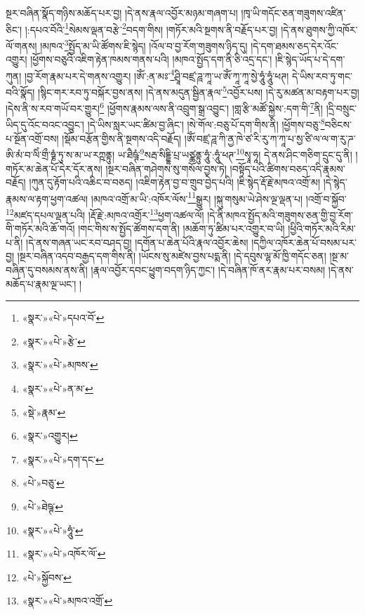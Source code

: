 སྔར་བཞིན་སྣོད་གཉིས་མཆོད་པར་བྱ། །དེ་ནས་རྣལ་འབྱོར་མཉམ་གཞག་པ། །ཁྭ་ཡི་གདོང་ཅན་གཟུགས་འཛིན་ཅིང་། །:དཔའ་བོའི་\footnote{«སྣར་»«པེ་»དཔའ་བོ་}སེམས་ལྡན་བརྩེ་\footnote{«སྣར་»«པེ་»རྩེ་}བདག་གིས། །གཏོར་མའི་སྔགས་ནི་བརྗོད་པར་བྱ། །དེ་ནས་ཐུགས་ཀྱི་འཁོར་ལོ་གནས། །མཁའ་\footnote{«སྣར་»«པེ་»མཁས་}སྤྱོད་མ་ཡི་ཚོགས་ཇི་སྙེད། །འོལ་བ་བྱ་རོག་གཟུགས་ཉིད་དུ། །དེ་དག་ཐམས་ཅད་དེར་འོང་འགྱུར། །ཕྱོགས་བཅུའི་འཇིག་རྟེན་ཁམས་གནས་པའི། །མཁའ་སྤྱོད་དག་ནི་ཅི་འདྲ་དང་། །ཇི་སྙེད་ཡོད་པ་དེ་དག་ཀུན། །བྱ་རོག་རྣམ་པར་དེ་གནས་འགྱུར། །ཨོཾ་:ན་མཿ་\footnote{«སྣར་»«པེ་»ན་མ་}ཤྲཱི་བཛྲ་ཌཱ་ཀཱ་ཡ་ཨོཾ་ཀཱ་ཀཱ་སྱེ་ཧཱུཾ་ཧཱུཾ་ཕཊ། དེ་ཡིས་རབ་ཏུ་གང་བའི་སྣོད། །སྙིང་གར་རབ་ཏུ་བསྐོར་བྱས་ནས། །དེ་ནས་མདུན་སྦྱིན་རྣལ་\footnote{«སྡེ་»རྣམ་}འབྱོར་པས། །དེ་རུ་མཚན་མ་བརྟག་པར་བྱ། །དེས་ནི་ས་རབ་གཡོ་བར་གྱུར།\footnote{«སྣར་»འགྱུར།} །ཕྱོགས་རྣམས་ལས་ནི་འབྲུག་སྒྲ་འབྱུང་། །གླ་རྩི་མཚོ་སྐྱེས་:དག་གི་\footnote{«སྣར་»«པེ་»དག་དང་}ནི། །དྲི་བསྲུང་ཡིད་དུ་འོང་བའང་འབྱུང་། །དེ་ཡིས་སླར་ཡང་ཚིམ་བྱ་ཞིང་། །སེ་གོལ་:བཅུ་པོ་དག་གིས་ནི། །ཕྱོགས་བཅུ་\footnote{«པེ་»བཅུ་}བཅིངས་པ་སྔོན་འགྲོ་བས། །སྡོམ་བརྩོན་གྱིས་ནི་སྔགས་འདི་བརྗོད། །ཨོཾ་བཛྲ་ཌཱ་ཀི་ནྱ་ཁེ་ཙ་རི་རུ་ཀ་ཀཱ་པ་སྱ་ཙི་ལ་ལ་ག་རུ་ཌ་ཨི་མཾ་བ་ལིཾ་གྲྀ་ཧྞཾ་ཏུ་ས་མ་ཡ་རཀྵནྟུ། ཡ་ཐཻཥྚཾ་\footnote{«པེ་»ཐེཥྚ་}སརྦ་སིདྡྷི་པྲ་ཡཙྪནྟུ་ཧཱུཾ་:ཧཱུཾ་ཕཊ་\footnote{«སྣར་»«པེ་»ཧཱུཾ་}སྭཱ་ཧཱ། དེ་ནས་ཤིང་གཅིག་དྲུང་དུ་ནི། །གཏོར་མ་ཆེན་པོ་དེར་དོར་ནས། །སྔར་བཞིན་གཤེགས་སུ་གསོལ་བྱས་ཏེ། །བསྟོད་པའི་ཚིགས་བཅད་འདི་རྣམས་བརྗོད། །ཀུན་དུ་རྟོག་པའི་འཆིང་བ་བཅད། །འཇིག་རྟེན་བྱ་བ་གྲུབ་བྱེད་པའི། །ཇི་སྙེད་རྡོ་རྗེ་མཁའ་འགྲོ་མ། །དེ་སྙེད་རྣམས་ལ་རྟག་ཕྱག་འཚལ། །མཁའ་འགྲོ་མ་ཡི་:འཁོར་ལོས་\footnote{«སྣར་»«པེ་»འཁོར་ལོ་}སྒྱུར། །སྐུ་གསུམ་ཡེ་ཤེས་ལྔ་ལྡན་པ། །འགྲོ་བ་སྐྱོབ་\footnote{«པེ་»སྐྱོབས་}མཛད་དཔལ་ལྡན་པའི། །རྡོ་རྗེ་:མཁའ་འགྲོར་\footnote{«སྣར་»«པེ་»མཁའ་འགྲོ་}ཕྱག་འཚལ་ལོ། །དེ་ནི་མཁའ་སྤྱོད་མའི་གཟུགས་ཅན་གྱི་བྱ་རོག་གི་གཏོར་མའི་ཆོ་གའོ། །གང་གིས་ས་སྤྱོད་ཚོགས་དག་ནི། །མཆོག་ཏུ་ཚིམ་པར་འགྱུར་བ་ཡི། །ཕྱིའི་གཏོར་མའི་རིམ་པ་ནི། །དེ་ནས་གཞན་ཡང་རབ་བཤད་བྱ། །དགོན་པ་ཆེན་པོའི་རྣལ་འབྱོར་ཆེས། །དཀྱིལ་འཁོར་ཆེན་པོ་བསམ་པར་བྱ། །སྔར་བཞིན་འདབ་བརྒྱད་དག་གིས་ནི། །ཡོངས་སུ་མཛེས་བྱས་པདྨ་ནི། །དེ་དབུས་ལྷ་མོ་ཁྱི་གདོང་ཅན། །སྔ་མ་བཞིན་དུ་བསམས་ནས་ནི། །རྣལ་འབྱོར་དབང་ཕྱུག་བདག་ཉིད་ཀྱང་། །དེ་བཞིན་ཁོ་ནར་རྣམ་པར་བསམ། །དེ་ནས་མཆོད་པ་རྣམ་ལྔ་ཡང་། །
